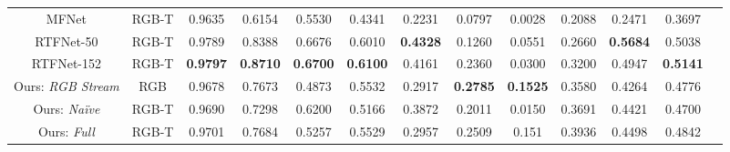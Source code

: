 \documentclass[letterpaper, 10 pt, conference]{ieeeconf}
\begin{document}
\begin{table*}[htb!]
\begin{tabular}{|c|c|c|c|c|c|c|c|c|c|c|c|c|}
 MFNet & RGB-T & 0.9635 & 0.6154 & 0.5530 & 0.4341 & 0.2231 & 0.0797 & 0.0028 & 0.2088 & 0.2471 & 0.3697\\
 RTFNet-50 & RGB-T  & 0.9789 & 0.8388 & 0.6676 & 0.6010 & \textbf{0.4328} & 0.1260 & 0.0551 & 0.2660 & \textbf{0.5684} & 0.5038\\
 RTFNet-152 & RGB-T & \textbf{0.9797} & \textbf{0.8710} & \textbf{0.6700} & \textbf{0.6100} & 0.4161 & 0.2360 & 0.0300 & 0.3200 & 0.4947 & \textbf{0.5141}\\
 \hline
 Ours: \textit{RGB Stream} & RGB & 0.9678 & 0.7673 & 0.4873 & 0.5532 & 0.2917 & \textbf{0.2785} & \textbf{0.1525} & 0.3580 & 0.4264 & 0.4776\\
 Ours: \textit{Na\"ive} & RGB-T & 0.9690 & 0.7298 & 0.6200 & 0.5166 & 0.3872 & 0.2011 & 0.0150 & 0.3691 & 0.4421 & 0.4700\\
 Ours: \textit{Full} & RGB-T & 0.9701 & 0.7684 & 0.5257 & 0.5529 & 0.2957 & 0.2509 & 0.151 & 0.3936 & 0.4498 & 0.4842\\
 \hline
\end{tabular}
\label{tab:mfnet_data}
\end{table*}
\end{document}
